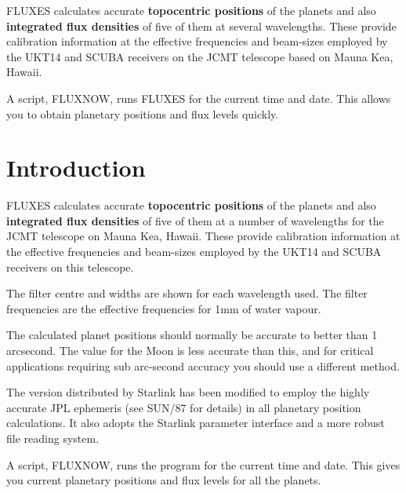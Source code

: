 \documentclass[11pt,twoside]{article}
\newcommand{\stardocinitials}  {SUN}
\newcommand{\stardocnumber}    {213.3}
\newcommand{\stardocabstract}  {
FLUXES calculates accurate {\bf topocentric positions} of the planets and also
{\bf integrated flux densities} of five of them at several wavelengths.
These provide calibration information at the effective frequencies and
beam-sizes employed by the UKT14 and SCUBA receivers on the
JCMT telescope based on Mauna Kea, Hawaii.

A script, FLUXNOW, runs FLUXES for the current time and date.
This allows you to obtain planetary positions and flux levels quickly.
}
\newcommand{\stardocname}{\stardocinitials /\stardocnumber}
\newcommand{\htmladdnormallink}[2]{#1}
\newenvironment{latexonly}{}{}
\newcommand{\xref}[3]{#1}
\newcommand{\xlabel}[1]{}
\renewcommand{\_}{\texttt{\symbol{95}}}
\renewcommand{\thepage}{\roman{page}}
\begin{document}
\stardocabstract
  \newpage
  \begin{latexonly}
    \setlength{\parskip}{0mm}
    \tableofcontents
    \setlength{\parskip}{\medskipamount}
    \markboth{\stardocname}{\stardocname}
  \end{latexonly}

\cleardoublepage
\renewcommand{\thepage}{\arabic{page}}
\setcounter{page}{1}

\section{Introduction}
\xlabel{INTRODUCTION}
\label{sec:introduction}

FLUXES calculates accurate \textbf{topocentric positions} of the planets and
also \textbf{integrated flux densities} of five of them at a number of
wavelengths for the
\htmladdnormallink{JCMT telescope}{http://www.jach.hawaii.edu/JCMT/home.html}
on Mauna Kea, Hawaii.  These provide calibration information at the effective
frequencies and beam-sizes employed by the UKT14 and SCUBA receivers on this
telescope.

The filter centre and widths are shown for each wavelength used.  The filter
frequencies are the effective frequencies for 1mm of water vapour.

The calculated planet positions should normally be accurate to better than 1
arcsecond. The value for the Moon is less accurate than this, and for critical
applications requiring sub arc-second accuracy you should use a different
method.

The version distributed by Starlink has been modified to employ the highly
accurate \xref{JPL ephemeris}{sun87}{} (see \xref{SUN/87}{sun87}{} for
details) in all planetary position calculations. It also adopts the Starlink
parameter interface and a more robust file reading system.

A script, FLUXNOW, runs the program for the current time and date.  This gives
you current planetary positions and flux levels for all the planets.
\end{document}
